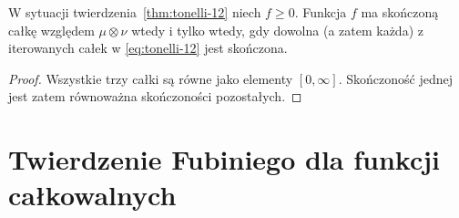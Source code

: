 \begin{wniosek}
\label{cor:tonelli-integrability-12}
W sytuacji twierdzenia~\ref{thm:tonelli-12}
niech $f\ge0$. Funkcja $f$ ma skończoną całkę
względem $\mu\otimes\nu$ wtedy i tylko wtedy,
gdy dowolna (a zatem każda) z iterowanych całek
w \eqref{eq:tonelli-12} jest skończona.
\end{wniosek}
\begin{proof}
Wszystkie trzy całki są równe jako elementy
$[0,\infty]$. Skończoność jednej jest zatem
równoważna skończoności pozostałych.
\end{proof}

\section{Twierdzenie Fubiniego dla funkcji całkowalnych}

